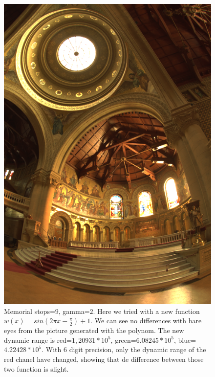 \documentclass[a4paper,12pt,oneside,final]{report}
\begin{document}
\begin{figure}[!h]
\centering
\includegraphics[scale=0.7]{pictures/stops_9_gamma_2.png}
\caption{Memorial stops=$9$, gamma=$2$. Here we tried with a new function $w(x)=sin(2\pi x-\frac{\pi}{2})+1$. We can see no differences with bare eyes from the picture generated with the polynom. The new dynamic range is red=$1,20931*10^5$, green=$6.08245*10^5$, blue=$4.22428*10^5$. With 6 digit precision, only the dynamic range of the red chanel have changed, showing that de difference between those two function is slight.}
\end{figure}
\end{document}
